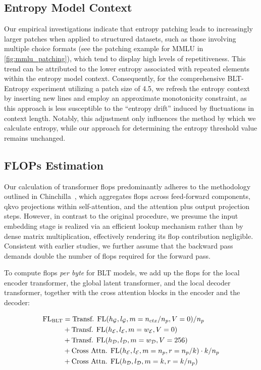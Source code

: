 \subsection{Entropy Model Context}
\label{section:entropy-context}
Our empirical investigations indicate that entropy patching leads to increasingly larger patches when applied to structured datasets, such as those involving multiple choice formats (see the patching example for MMLU in \autoref{fig:mmlu_patching}), which tend to display high levels of repetitiveness. This trend can be attributed to the lower entropy associated with repeated elements within the entropy model context. Consequently, for the comprehensive {\textsc BLT}-Entropy experiment utilizing a patch size of 4.5, we refresh the entropy context by inserting new lines and employ an approximate monotonicity constraint, as this approach is less susceptible to the “entropy drift” induced by fluctuations in context length. Notably, this adjustment only influences the method by which we calculate entropy, while our approach for determining the entropy threshold value remains unchanged.

\subsection{FLOPs Estimation} 
\label{section:flops}

Our calculation of transformer flops predominantly adheres to the methodology outlined in Chinchilla~\citep{hoffmann2022training}, which aggregates flops across feed-forward components, qkvo projections within self-attention, and the attention plus output projection steps. However, in contrast to the original procedure, we presume the input embedding stage is realized via an efficient lookup mechanism rather than by dense matrix multiplication, effectively rendering its flop contribution negligible. Consistent with earlier studies, we further assume that the backward pass demands double the number of flops required for the forward pass.

To compute flops \textit{per byte} for {\textsc BLT} models, we add up the flops for the local encoder transformer, the global latent transformer, and the local decoder transformer, together with the cross attention blocks in the encoder and the decoder:

\begin{align}
    \text{FL}_{\text{{\textsc BLT}}} &= \text{Transf. FL}(h_{\mathcal{G}}, l_{\mathcal{G}}, m=n_{ctx}/n_p, V=0) / n_p\\
   &+ \text{Transf. FL}(h_{\mathcal{E}}, l_{\mathcal{E}}, m=w_{\mathcal{E}}, V=0) \\
   &+ \text{Transf. FL}(h_{\mathcal{D}}, l_{\mathcal{D}}, m=w_{\mathcal{D}}, V=256) \\ 
    &+ \text{Cross Attn. FL}(h_{\mathcal{E}}, l_{\mathcal{E}}, m=n_p, r=n_p/k) \cdot k/n_p \\ 
   &+ \text{Cross Attn. FL}(h_{\mathcal{D}}, l_{\mathcal{D}}, m=k, r=k/n_p) 
\end{align}

